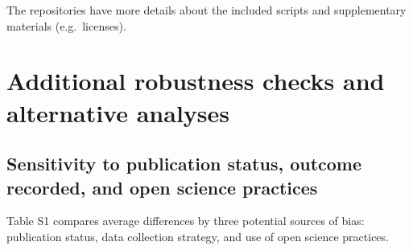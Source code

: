 \documentclass[sn-nature,referee,pdflatex]{sn-jnl}
\begin{document}
The repositories have more details about the included scripts and
supplementary materials (e.g.~licenses).

\section{Additional robustness checks and alternative
analyses}\label{additional-robustness-checks-and-alternative-analyses}

\subsection{Sensitivity to publication status, outcome recorded, and
open science
practices}\label{sensitivity-to-publication-status-outcome-recorded-and-open-science-practices}

Table S1 compares average differences by three potential sources of
bias: publication status, data collection strategy, and use of open
science practices.
\end{document}
